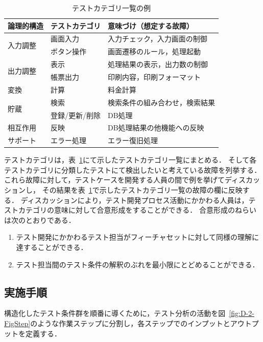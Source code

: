 \begin{table}[htbp]
  \centering
  \caption{テストカテゴリ一覧の例}
    \begin{tabular}{|p{6em}|p{8.07em}|p{14.645em}|}
    \hline
    論理的構造 & テストカテゴリ & 意味づけ（想定する故障）\bigstrut\\
    \hline
    \hline
    \multirow{2}[4]{*}{入力調整} & 画面入力 & 入力チェック，入力画面の制御 \bigstrut\\
\cline{2-3}    \multicolumn{1}{|l|}{} & ボタン操作 & 画面遷移のルール，処理起動 \bigstrut\\
    \hline
      \multirow{2}[4]{*}{出力調整} & 表示& 処理結果の表示，出力数の制御 \bigstrut\\
\cline{2-3}
    \multicolumn{1}{|r|}{} & 帳票出力 & 印刷内容，印刷フォーマット \bigstrut\\
    \hline
    変換 & 計算 & 料金計算 \bigstrut\\
    \hline
    \multirow{2}[4]{*}{貯蔵} & 検索 & 検索条件の組み合わせ，検索結果 \bigstrut\\
\cline{2-3}    \multicolumn{1}{|l|}{} & 登録/更新/削除 & DB処理 \bigstrut\\
    \hline
    相互作用 & 反映 & DB処理結果の他機能への反映 \bigstrut\\
    \hline
    サポート & エラー処理 & エラー復旧処理\bigstrut\\
    \hline
    \end{tabular}%
  \label{tab:D-2-tabTCL}%
\end{table}

テストカテゴリは，表~\ref{tab:D-2-tabTCL}にて示したテストカテゴリ一覧にまとめる．
そして各テストカテゴリに分類したテストにて検出したいと考えている故障を列挙する．
これら故障に対して，テストケースを開発する人員の間で例を挙げてディスカッションし，
その結果を表~\ref{tab:D-2-tabTCL}で示したテストカテゴリ一覧の故障の欄に反映する．
ディスカッションにより，テスト開発プロセス活動にかかわる人員は，テストカテゴリの意味に対して合意形成をすることができる．
合意形成のねらいは次のとおりである．

\begin{enumerate}
\item テスト開発にかかわるテスト担当がフィーチャセットに対して同様の理解に達することができる．
\item テスト担当間のテスト条件の解釈のぶれを最小限にとどめることができる．
\end{enumerate}


\subsection{実施手順}
構造化したテスト条件群を順番に導くために，テスト分析の活動を図~\ref{fig:D-2-FigStep}のような作業ステップに分割し，各ステップでのインプットとアウトプットを定義する．


